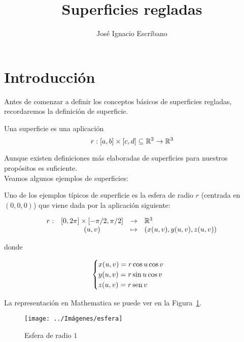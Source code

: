 \documentclass[10pt,a4paper]{article}
\author{José Ignacio Escribano}
\title{Superficies regladas}
\begin{document}
	

\tableofcontents
\newpage

\listoffigures
\newpage

\section{Introducción}

Antes de comenzar a definir los conceptos básicos de superficies regladas, recordaremos la definición de superficie.

\begin{defi}
	Una superficie es una aplicación
	\begin{equation}
	r : [a,b] \times [c,d] \subseteq \mathbb{R}^2 \to \mathbb{R}^3
	\end{equation}
\end{defi}

Aunque existen definiciones más elaboradas de superficies para nuestros propósitos es suficiente.\\

Veamos algunos ejemplos de superficies:

\begin{ejemplo}[Esfera]
Uno de los ejemplos típicos de superficie es la esfera de radio $r$ (centrada en $(0,0,0)$) que viene dada por la aplicación siguiente:

$$\begin{array}{rcll}
	r : & [0, 2\pi] \times [-\pi/2, \pi/2] & \to & \mathbb{R}^3\\
		& (u,v) & \mapsto & (x(u,v), y(u,v), z(u,v))
\end{array}$$
		
donde 

$$\begin{cases}
x(u,v) = r\cos u \cos v \\
y(u,v) = r\sin u \cos v \\
z(u,v) = r\mathop{\mbox{\normalfont sen}}\nolimits v
\end{cases}$$

La representación en Mathematica se puede ver en la Figura~\ref{fig:esfera}.

\begin{figure}[thbp]
	\centering
	\texttt{[image: ../Imágenes/esfera]}
	\caption{Esfera de radio $1$}
	\label{fig:esfera}
\end{figure}

\end{ejemplo}
\end{document}
